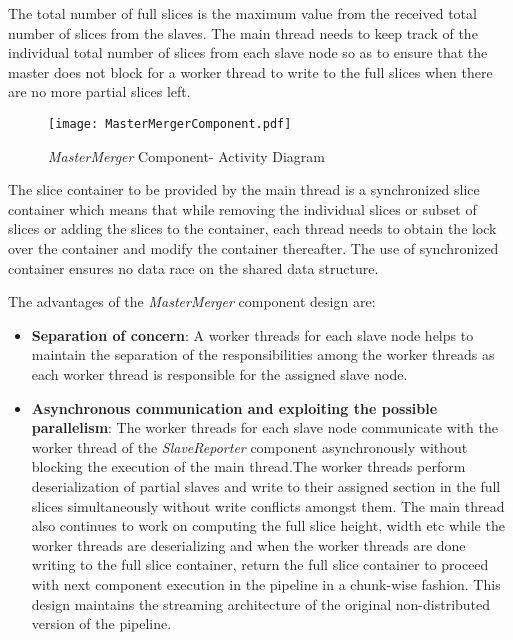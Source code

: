 The total number of full slices is the maximum value from the received total number of slices from the slaves. The main thread needs to keep track of the individual total number of slices from each slave node so as to ensure that the master does not block for a worker thread to write to the full slices when there are no more partial slices left. 

\begin{figure}[ht!]
\centering
\texttt{[image: MasterMergerComponent.pdf]}
\caption{\textit{MasterMerger} Component- Activity Diagram}
\label{fig:MasterMergerComponent}
\end{figure}

The slice container to be provided by the main thread is a synchronized slice container which means that while removing the individual slices or subset of slices or adding the slices to the container, each thread needs to obtain the lock over the container and modify the container thereafter. The use of synchronized container ensures no data race on the shared data structure. \newline 

The advantages of the \textit{MasterMerger} component design are:  
\begin{itemize}
\item \textbf{Separation of concern}: A worker threads for each slave node helps to maintain the separation of the responsibilities among the worker threads as each worker thread is responsible for the assigned slave node.
\item \textbf{Asynchronous communication and exploiting the possible parallelism}: The worker threads for each slave node communicate with the worker thread of the \textit{SlaveReporter} component asynchronously without blocking the execution of the main thread.The worker threads perform deserialization of partial slaves and write to their assigned section in the full slices simultaneously without write conflicts amongst them. The main thread also continues to work on computing the full slice height, width etc while the worker threads are deserializing and when the worker threads are done writing to the full slice container, return the full slice container to proceed with next  component execution in the pipeline in a chunk-wise fashion. This design maintains the streaming architecture of the original non-distributed version of the pipeline. 
\end{itemize}


